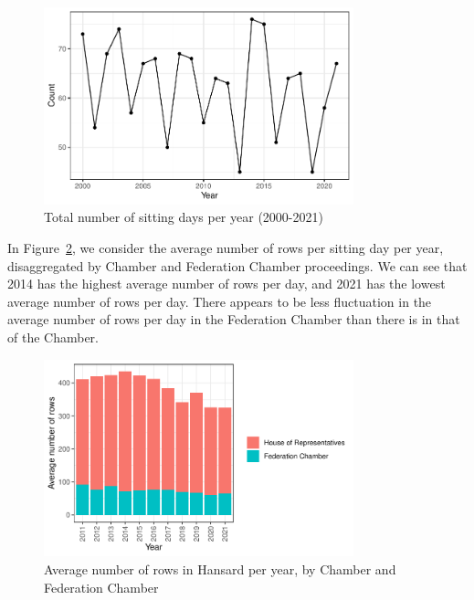 \documentclass[
  letterpaper,
  DIV=11,
  numbers=noendperiod]{scrartcl}
\begin{document}
\begin{figure}

{\centering \includegraphics[width=0.8\textwidth,height=\textheight]{paper_files/figure-pdf/fig-plot1-1.pdf}

}

\caption{\label{fig-plot1}Total number of sitting days per year
(2000-2021)}

\end{figure}

In Figure~\ref{fig-plot2}, we consider the average number of rows per
sitting day per year, disaggregated by Chamber and Federation Chamber
proceedings. We can see that 2014 has the highest average number of rows
per day, and 2021 has the lowest average number of rows per day. There
appears to be less fluctuation in the average number of rows per day in
the Federation Chamber than there is in that of the Chamber.

\begin{figure}

{\centering \includegraphics[width=0.8\textwidth,height=\textheight]{paper_files/figure-pdf/fig-plot2-1.pdf}

}

\caption{\label{fig-plot2}Average number of rows in Hansard per year, by
Chamber and Federation Chamber}

\end{figure}
\end{document}
